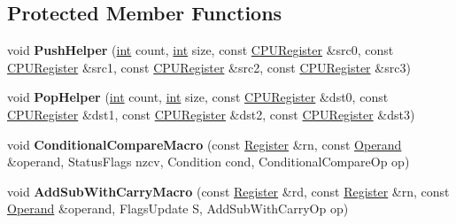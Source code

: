 \subsection*{Protected Member Functions}
\begin{DoxyCompactItemize}
\item 
\mbox{\label{classv8_1_1internal_1_1TurboAssembler_ab9017bf6f08278891b79d116b360216f}} 
void {\bfseries Push\+Helper} (\mbox{\hyperlink{classint}{int}} count, \mbox{\hyperlink{classint}{int}} size, const \mbox{\hyperlink{classv8_1_1internal_1_1CPURegister}{C\+P\+U\+Register}} \&src0, const \mbox{\hyperlink{classv8_1_1internal_1_1CPURegister}{C\+P\+U\+Register}} \&src1, const \mbox{\hyperlink{classv8_1_1internal_1_1CPURegister}{C\+P\+U\+Register}} \&src2, const \mbox{\hyperlink{classv8_1_1internal_1_1CPURegister}{C\+P\+U\+Register}} \&src3)
\item 
\mbox{\label{classv8_1_1internal_1_1TurboAssembler_ac076db78783d950ccf7701c4dba711e7}} 
void {\bfseries Pop\+Helper} (\mbox{\hyperlink{classint}{int}} count, \mbox{\hyperlink{classint}{int}} size, const \mbox{\hyperlink{classv8_1_1internal_1_1CPURegister}{C\+P\+U\+Register}} \&dst0, const \mbox{\hyperlink{classv8_1_1internal_1_1CPURegister}{C\+P\+U\+Register}} \&dst1, const \mbox{\hyperlink{classv8_1_1internal_1_1CPURegister}{C\+P\+U\+Register}} \&dst2, const \mbox{\hyperlink{classv8_1_1internal_1_1CPURegister}{C\+P\+U\+Register}} \&dst3)
\item 
\mbox{\label{classv8_1_1internal_1_1TurboAssembler_a029ff160bc8b2e0d6fc7fd922ad13502}} 
void {\bfseries Conditional\+Compare\+Macro} (const \mbox{\hyperlink{classv8_1_1internal_1_1Register}{Register}} \&rn, const \mbox{\hyperlink{classv8_1_1internal_1_1Operand}{Operand}} \&operand, Status\+Flags nzcv, Condition cond, Conditional\+Compare\+Op op)
\item 
\mbox{\label{classv8_1_1internal_1_1TurboAssembler_a386211d51f8475a5671cae17b1659b73}} 
void {\bfseries Add\+Sub\+With\+Carry\+Macro} (const \mbox{\hyperlink{classv8_1_1internal_1_1Register}{Register}} \&rd, const \mbox{\hyperlink{classv8_1_1internal_1_1Register}{Register}} \&rn, const \mbox{\hyperlink{classv8_1_1internal_1_1Operand}{Operand}} \&operand, Flags\+Update S, Add\+Sub\+With\+Carry\+Op op)

\end{DoxyCompactItemize}
